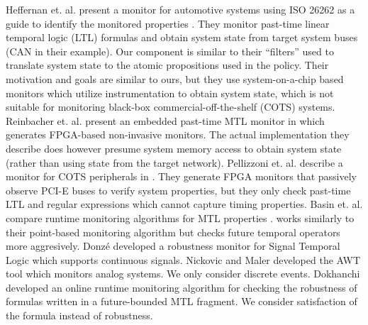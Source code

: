 Heffernan et. al. present a monitor for automotive systems using ISO 26262 as a guide
to identify the monitored properties  \cite{Heffernan2014}.
They monitor past-time linear temporal logic (LTL) formulas and obtain system state from target system buses (CAN in their example).
Our \sfmap component is similar to their ``filters'' used to translate system state to the atomic propositions used in the policy.
Their motivation and goals are similar to ours, but they use system-on-a-chip based
monitors which utilize instrumentation to obtain system state, which is not suitable for monitoring black-box commercial-off-the-shelf (COTS)
systems. Reinbacher et. al. present an embedded past-time MTL monitor in \cite{Reinbacher2013} which generates FPGA-based non-invasive monitors.
The actual implementation they describe does however presume system memory access to obtain system state (rather than using state from the target network).
Pellizzoni et. al. describe a monitor for COTS peripherals in \cite{Pellizzoni2008}.
They generate FPGA monitors that passively observe PCI-E buses to verify system properties, but they only check past-time LTL and
regular expressions which cannot capture timing properties.
Basin et. al. compare runtime monitoring algorithms for MTL properties \cite{Basin2012}.
\monitor works similarly to their point-based monitoring algorithm but \monitor checks
future temporal operators more aggresively.
Donz\'e \etal \cite{DFM13} developed a robustness monitor for Signal Temporal Logic  which
supports continuous signals.
Nickovic and Maler \cite{NM07} developed the  AWT tool which monitors analog systems.
We only consider discrete events. Dokhanchi \etal \cite{DHF14}
developed an online runtime monitoring algorithm for checking the robustness of formulas written in a
future-bounded MTL fragment. We consider satisfaction of the formula
instead of robustness.
